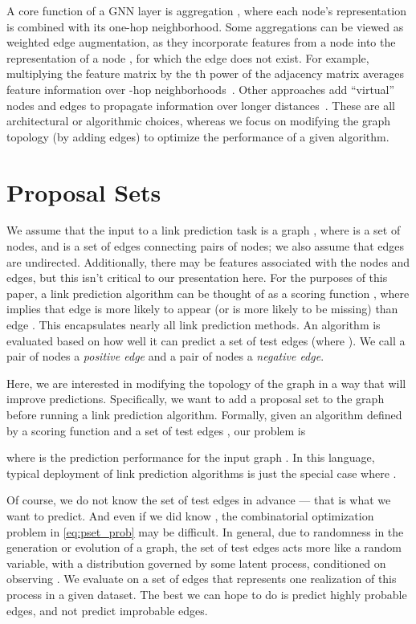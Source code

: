 \documentclass{article}
\newcommand{\xhdr}[1]{\vspace{1.0mm}\noindent{\textbf{#1.}}\hspace{1mm}}
\begin{document}
\xhdr{Neighborhood Aggregation}
A core function of a GNN layer is aggregation \cite{Gilmer2017NeuralMP}, where each node's representation is combined \cite{Hamilton2017RepresentationLO} with its one-hop neighborhood.
Some aggregations can be viewed as weighted edge augmentation, as they incorporate features from a node  into the representation of a node , for which the edge  does not exist. 
For example, multiplying the feature matrix by the th power of the adjacency matrix  averages
feature information over -hop neighborhoods~\cite{chien2020joint,Rossi2020SIGNSI,Wu2019SimplifyingGC}. 
Other approaches add ``virtual'' nodes and edges to propagate information over longer distances~\cite{Alon2020OnTB,Gilmer2017NeuralMP}.
These are all architectural or algorithmic choices, whereas
we focus on modifying the graph topology (by adding edges) to optimize the performance of a given algorithm.


\section{Proposal Sets}\label{methods}

We assume that the input to a link prediction task is a graph , where  is a set of nodes, and  is a set of edges connecting pairs of nodes; we also assume that edges are undirected.
Additionally, there may be features associated with the nodes and edges, but this isn't critical to our presentation here.
For the purposes of this paper, a link prediction algorithm can be thought of as a scoring function , where
 implies that edge  is more likely to appear (or is more likely to be missing) than edge .
This encapsulates nearly all link prediction methods.
An algorithm is evaluated based on how well it can predict a set of test edges  (where ).
We call a pair of nodes  a \emph{positive edge} and a pair of nodes  a \emph{negative edge}.

Here, we are interested in modifying the topology of the graph in a way that will improve predictions.
Specifically, we want to add a proposal set  to the graph before running a link prediction algorithm.
Formally, given an algorithm defined by a scoring function  and a set of test edges , our problem is

where  is the prediction performance for the input graph .
In this language, typical deployment of link prediction algorithms is just the special case where .

Of course, we do not know the set of test edges  in advance --- that is what we want to predict.
And even if we did know , the combinatorial optimization problem in \cref{eq:pset_prob} may be difficult.
In general, due to randomness in the generation or evolution of a graph, the set of test edges  acts more like a random variable, with a distribution governed by some latent process, conditioned on observing .
We evaluate on a set of edges that represents one realization of this process in a given dataset.
The best we can hope to do is predict highly probable edges, and not predict improbable edges.
\end{document}
